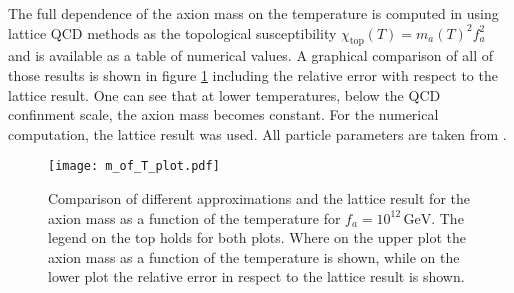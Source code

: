 \documentclass[twoside,a4paper, 12pt]{article}
\numberwithin{equation}{section}
\begin{document}


\noindent
The full dependence of the axion mass on the temperature is computed in \cite{LatticQCD4Cosmo}
using lattice QCD methods as the topological susceptibility $\chi_\mathrm{top}(T) = m_a(T)^2 f_a^2$ and is available as a table of numerical values.
A graphical comparison of all of those results is shown in figure \ref{fig:m_a_of_T_plot}
including the relative error with respect to the lattice result.
One can see that at lower temperatures, below the QCD confinment scale, the axion mass becomes constant.
For the numerical computation, the lattice result was used.
All particle parameters are taken from \cite{PDG}.
\begin{figure}
    \centering
    \texttt{[image: m\_of\_T\_plot.pdf]}
    \caption{Comparison of different approximations and the lattice result for the axion mass as a
    function of the temperature for $f_a = 10^{12} \, \mathrm{GeV}$.
    The legend on the top holds for both plots. Where on the upper plot the axion mass as a function of
    the temperature is shown, while on the lower plot the relative error in respect to the lattice result
    is shown.}
    \label{fig:m_a_of_T_plot}
\end{figure}
\end{document}
